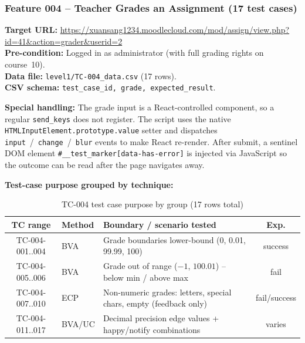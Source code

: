 \documentclass[twoside,final]{hcmut-report}
\begin{document}
\subsubsection{Feature 004 -- Teacher Grades an Assignment (17 test cases)}

\textbf{Target URL:} \url{https://xuansang1234.moodlecloud.com/mod/assign/view.php?id=41&action=grader&userid=2}\\
\textbf{Pre-condition:} Logged in as administrator (with full grading rights on course~10).\\
\textbf{Data file:} \texttt{level1/TC-004\_data.csv} (17 rows).\\
\textbf{CSV schema:} \texttt{test\_case\_id, grade, expected\_result}.

\textbf{Special handling:} The grade input is a React-controlled component, so a regular \texttt{send\_keys} does not register. The script uses the native \texttt{HTMLInputElement.prototype.value} setter and dispatches \texttt{input}~/~\texttt{change}~/~\texttt{blur} events to make React re-render. After submit, a sentinel DOM element \texttt{\#\_\_test\_marker[data-has-error]} is injected via JavaScript so the outcome can be read after the page navigates away.

\textbf{Test-case purpose grouped by technique:}
\begin{table}[H]
\centering
\renewcommand{\arraystretch}{1.2}
\begin{tabularx}{\textwidth}{|c|l|X|c|}
\hline
\textbf{TC range} & \textbf{Method} & \textbf{Boundary / scenario tested} & \textbf{Exp.} \\ \hline
TC-004-001..004 & BVA & Grade boundaries lower-bound (0, 0.01, 99.99, 100) & success \\ \hline
TC-004-005..006 & BVA & Grade out of range ($-1$, $100.01$) -- below min / above max & fail \\ \hline
TC-004-007..010 & ECP & Non-numeric grades: letters, special chars, empty (feedback only) & fail/success \\ \hline
TC-004-011..017 & BVA/UC & Decimal precision edge values + happy/notify combinations & varies \\ \hline
\end{tabularx}
\caption{TC-004 test case purpose by group (17 rows total)}
\end{table}

\end{document}
